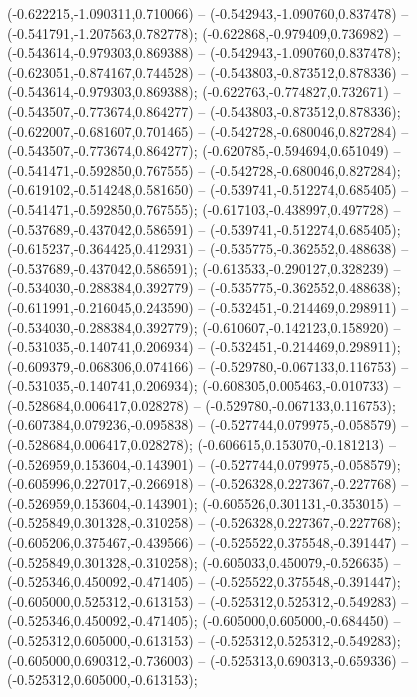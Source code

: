 (-0.622215,-1.090311,0.710066) -- (-0.542943,-1.090760,0.837478) -- (-0.541791,-1.207563,0.782778);
 (-0.622868,-0.979409,0.736982) -- (-0.543614,-0.979303,0.869388) -- (-0.542943,-1.090760,0.837478);
 (-0.623051,-0.874167,0.744528) -- (-0.543803,-0.873512,0.878336) -- (-0.543614,-0.979303,0.869388);
 (-0.622763,-0.774827,0.732671) -- (-0.543507,-0.773674,0.864277) -- (-0.543803,-0.873512,0.878336);
 (-0.622007,-0.681607,0.701465) -- (-0.542728,-0.680046,0.827284) -- (-0.543507,-0.773674,0.864277);
 (-0.620785,-0.594694,0.651049) -- (-0.541471,-0.592850,0.767555) -- (-0.542728,-0.680046,0.827284);
 (-0.619102,-0.514248,0.581650) -- (-0.539741,-0.512274,0.685405) -- (-0.541471,-0.592850,0.767555);
 (-0.617103,-0.438997,0.497728) -- (-0.537689,-0.437042,0.586591) -- (-0.539741,-0.512274,0.685405);
 (-0.615237,-0.364425,0.412931) -- (-0.535775,-0.362552,0.488638) -- (-0.537689,-0.437042,0.586591);
 (-0.613533,-0.290127,0.328239) -- (-0.534030,-0.288384,0.392779) -- (-0.535775,-0.362552,0.488638);
 (-0.611991,-0.216045,0.243590) -- (-0.532451,-0.214469,0.298911) -- (-0.534030,-0.288384,0.392779);
 (-0.610607,-0.142123,0.158920) -- (-0.531035,-0.140741,0.206934) -- (-0.532451,-0.214469,0.298911);
 (-0.609379,-0.068306,0.074166) -- (-0.529780,-0.067133,0.116753) -- (-0.531035,-0.140741,0.206934);
 (-0.608305,0.005463,-0.010733) -- (-0.528684,0.006417,0.028278) -- (-0.529780,-0.067133,0.116753);
 (-0.607384,0.079236,-0.095838) -- (-0.527744,0.079975,-0.058579) -- (-0.528684,0.006417,0.028278);
 (-0.606615,0.153070,-0.181213) -- (-0.526959,0.153604,-0.143901) -- (-0.527744,0.079975,-0.058579);
 (-0.605996,0.227017,-0.266918) -- (-0.526328,0.227367,-0.227768) -- (-0.526959,0.153604,-0.143901);
 (-0.605526,0.301131,-0.353015) -- (-0.525849,0.301328,-0.310258) -- (-0.526328,0.227367,-0.227768);
 (-0.605206,0.375467,-0.439566) -- (-0.525522,0.375548,-0.391447) -- (-0.525849,0.301328,-0.310258);
 (-0.605033,0.450079,-0.526635) -- (-0.525346,0.450092,-0.471405) -- (-0.525522,0.375548,-0.391447);
 (-0.605000,0.525312,-0.613153) -- (-0.525312,0.525312,-0.549283) -- (-0.525346,0.450092,-0.471405);
 (-0.605000,0.605000,-0.684450) -- (-0.525312,0.605000,-0.613153) -- (-0.525312,0.525312,-0.549283);
 (-0.605000,0.690312,-0.736003) -- (-0.525313,0.690313,-0.659336) -- (-0.525312,0.605000,-0.613153);
